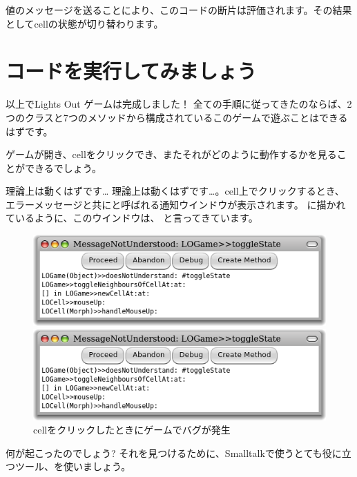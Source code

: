 \documentclass[a4paper,10pt,twoside]{book}
\begin{document}

値のメッセージを送ることにより、このコードの断片は評価されます。その結果としてcellの状態が切り替わります。

\section{コードを実行してみましょう}

以上でLights Out ゲームは完成しました！
全ての手順に従ってきたのならば、2つのクラスと7つのメソッドから構成されているこのゲームで遊ぶことはできるはずです。


ゲームが開き、cellをクリックでき、またそれがどのように動作するかを見ることができるでしょう。

理論上は動くはずです\ldots{}
理論上は動くはずです…。cell上でクリックするとき、エラーメッセージと共にと呼ばれる通知ウインドウが表示されます。 に描かれているように、このウインドウは、 と言ってきています。

\begin{figure}[ht]
\ifluluelse
	{\centerline{\includegraphics[width=\textwidth]{Error}}}
	{\centerline{\includegraphics[scale=0.7]{Error}}}
\caption{cellをクリックしたときにゲームでバグが発生
}
\end{figure}

\noindent
何が起こったのでしょう? それを見つけるために、Smalltalkで使うとても役に立つツール、を使いましょう。
\end{document}
